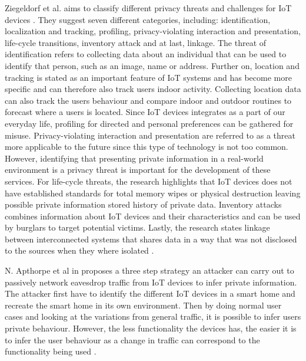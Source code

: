 Ziegeldorf et al. aims to classify different privacy threats and challenges for \gls{IoT} devices \cite{IoTPrivacyAndMisuse}. They suggest seven different categories, including: identification, localization and tracking, profiling, privacy-violating interaction and presentation, life-cycle transitions, inventory attack and at last, linkage. The threat of identification refers to collecting data about an individual that can be used to identify that person, such as an image, name or address. Further on, location and tracking is stated as an important feature of \gls{IoT} systems and has become more specific and can therefore also track users indoor activity. Collecting location data can also track the users behaviour and compare indoor and outdoor routines to forecast where a users is located. Since \gls{IoT} devices integrates as a part of our everyday life, profiling for directed and personal preferences can be gathered for misuse. Privacy-violating interaction and presentation are referred to as a threat more applicable to the future since this type of technology is not too common. However, identifying that presenting private information in a real-world environment is a privacy threat is important for the development of these services. For life-cycle threats, the research highlights that \gls{IoT} devices does not have established standards for total memory wipes or physical destruction leaving possible private information stored history of private data. Inventory attacks combines information about \gls{IoT} devices and their characteristics and can be used by burglars to target potential victims. Lastly, the research states linkage between interconnected systems that shares data in a way that was not disclosed to the sources when they where isolated \cite{IoTPrivacyAndMisuse}. 

N. Apthorpe et al in \cite{VulEncIoTTraffic} proposes a three step strategy an attacker can carry out to passively network eavesdrop traffic from \gls{IoT} devices to infer private information. The attacker first have to identify the different \gls{IoT} devices in a smart home and recreate the smart home in its own environment. Then by doing normal user cases and looking at the variations from general traffic, it is possible to infer users private behaviour. However, the less functionality the devices has, the easier it is to infer the user behaviour as a change in traffic can correspond to the functionality being used \cite{VulEncIoTTraffic}. 


